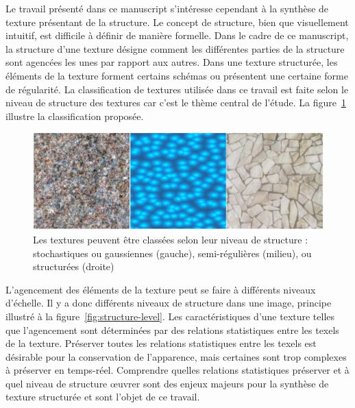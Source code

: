 Le travail présenté dans ce manuscript s'intéresse cependant à la synthèse de texture présentant de la structure. Le concept de structure, bien que visuellement intuitif, est difficile à définir de manière formelle. Dans le cadre de ce manuscript, la structure d'une texture désigne comment les différentes parties de la structure sont agencées les unes par rapport aux autres. Dans une texture structurée, les éléments de la texture forment certains schémas ou présentent une certaine forme de régularité. La classification de textures utilisée dans ce travail est faite selon le niveau de structure des textures car c'est le thème central de l'étude. La figure~\ref{fig:échelle-structure} illustre la classification proposée.

\bigskip

\begin{figure}[hb]
    \centering
    \includegraphics[width=\textwidth]{contenu/resources/images/structure_scale_loucas}
    \caption[Classification des textures selon leur niveau de structure]{Les textures peuvent être classées selon leur niveau de structure : stochastiques ou gaussiennes (gauche), semi-régulières (milieu), ou structurées (droite)}
    \label{fig:échelle-structure}
\end{figure}

L'agencement des éléments de la texture peut se faire à différents niveaux d'échelle. Il y a donc différents niveaux de structure dans une image, principe illustré à la figure~\ref{fig:structure-level}. Les caractéristiques d'une texture telles que l'agencement sont déterminées par des relations statistiques entre les texels de la texture. Préserver toutes les relations statistiques entre les texels est désirable pour la conservation de l'apparence, mais certaines sont trop complexes à préserver en temps-réel. Comprendre quelles relations statistiques préserver et à quel niveau de structure œuvrer sont des enjeux majeurs pour la synthèse de texture structurée et sont l'objet de ce travail.

